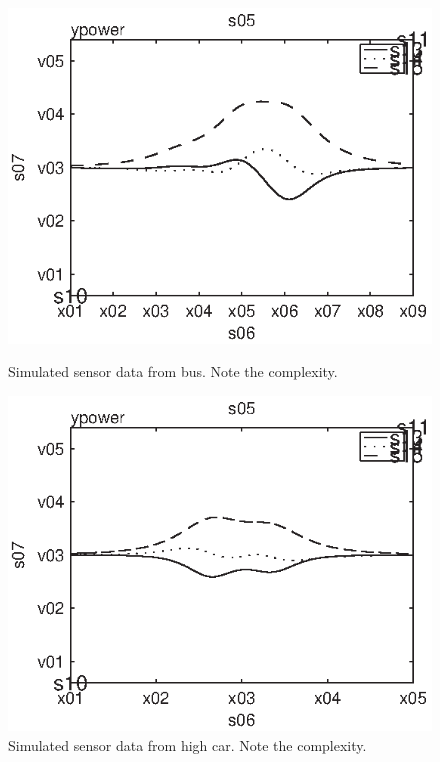 \begin{subfigures}
\begin{figure}[thb]
 \begin{minipage}{0.45\linewidth}
 	\centering
 	
    	\includegraphics[width=1\linewidth]{images/bus}
  	\caption[Simulated sensor data from a bus]{Simulated sensor data from bus. Note the complexity.}
  	\label{fig:simclass3}
 \end{minipage} \hfill
 \begin{minipage}{0.45\linewidth}
 	\centering
 	
   	\includegraphics[width=1\linewidth]{images/highcar}
  	\caption[Simulated sensor data from high car]{Simulated sensor data from high car. Note the complexity.}
  	\label{fig:simclass4}
 \end{minipage}
\end{figure}
\end{subfigures}

